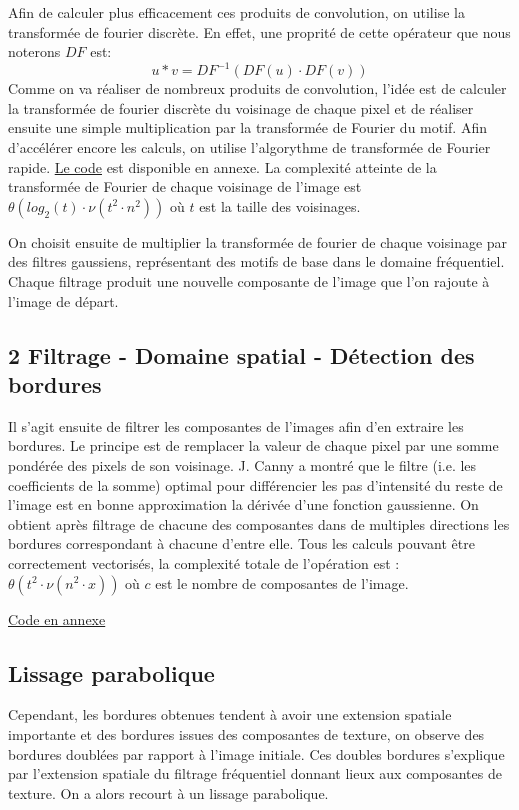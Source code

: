 \documentclass{article}
\begin{document}
\begin{multicols}{2}
Afin de calculer plus efficacement ces produits de convolution, on utilise la transformée de fourier discrète. En effet, une proprité de cette opérateur que nous noterons $DF$ est:
$$u * v = DF^{-1}(DF(u) \cdot DF(v))$$
Comme on va réaliser de nombreux produits de convolution, l'idée est de calculer la transformée de fourier discrète du voisinage de chaque pixel et de réaliser ensuite une simple multiplication par la transformée de Fourier du motif. Afin d'accélérer encore les calculs, on utilise l'algorythme de transformée de Fourier rapide. \hyperref[four]{Le code} est disponible en annexe. La complexité atteinte de la transformée de Fourier de chaque voisinage de l'image est $\theta(log_2(t) \cdot \nu(t^2 \cdot n^2))$ où $t$ est la taille des voisinages.

On choisit ensuite de multiplier la transformée de fourier de chaque voisinage par des filtres gaussiens, représentant des motifs de base dans le domaine fréquentiel. Chaque filtrage produit une nouvelle composante de l'image que l'on rajoute à l'image de départ.

\subsection{2 Filtrage - Domaine spatial - Détection des bordures}

Il s'agit ensuite de filtrer les composantes de l'images afin d'en extraire les bordures. Le principe est de remplacer la valeur de chaque pixel par une somme pondérée des pixels de son voisinage. J. Canny a montré que le filtre (i.e. les coefficients de la somme) optimal pour différencier les pas d'intensité du reste de l'image est en bonne approximation la dérivée d'une fonction gaussienne. On obtient après filtrage de chacune des composantes dans de multiples directions les bordures correspondant à chacune d'entre elle. Tous les calculs pouvant être correctement vectorisés, la complexité totale de l'opération est : $\theta(t^2 \cdot \nu(n^2 \cdot x))$ où $c$ est le nombre de composantes de l'image.

\hyperref[filt]{Code en annexe}

\subsection{Lissage parabolique}

Cependant, les bordures obtenues tendent à avoir une extension spatiale importante et des bordures issues des composantes de texture, on observe des bordures doublées par rapport à l'image initiale. Ces doubles bordures s'explique par l'extension spatiale du filtrage fréquentiel donnant lieux aux composantes de texture. On a alors recourt à un lissage parabolique.


\end{multicols}
\end{document}
